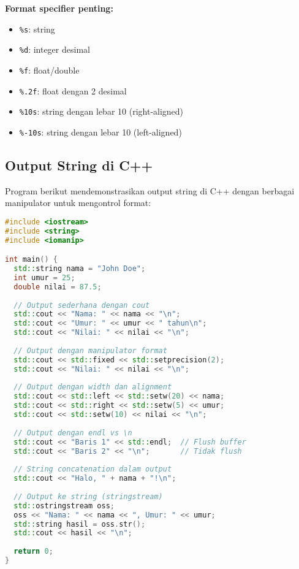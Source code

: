 \documentclass[../main.tex]{subfiles}
\begin{document}
\textbf{Format specifier penting:}
\begin{itemize}
  \item \texttt{\%s}: string
  \item \texttt{\%d}: integer desimal
  \item \texttt{\%f}: float/double
  \item \texttt{\%.2f}: float dengan 2 desimal
  \item \texttt{\%10s}: string dengan lebar 10 (right-aligned)
  \item \texttt{\%-10s}: string dengan lebar 10 (left-aligned)
\end{itemize}

\subsection{Output String di C++}

Program berikut mendemonstrasikan output string di C++ dengan berbagai manipulator untuk mengontrol format:

\begin{lstlisting}[language=C++, caption={Output string di C++}]
#include <iostream>
#include <string>
#include <iomanip>

int main() {
  std::string nama = "John Doe";
  int umur = 25;
  double nilai = 87.5;
  
  // Output sederhana dengan cout
  std::cout << "Nama: " << nama << "\n";
  std::cout << "Umur: " << umur << " tahun\n";
  std::cout << "Nilai: " << nilai << "\n";
  
  // Output dengan manipulator format
  std::cout << std::fixed << std::setprecision(2);
  std::cout << "Nilai: " << nilai << "\n";
  
  // Output dengan width dan alignment
  std::cout << std::left << std::setw(20) << nama;
  std::cout << std::right << std::setw(5) << umur;
  std::cout << std::setw(10) << nilai << "\n";
  
  // Output dengan endl vs \n
  std::cout << "Baris 1" << std::endl;  // Flush buffer
  std::cout << "Baris 2" << "\n";       // Tidak flush
  
  // String concatenation dalam output
  std::cout << "Halo, " + nama + "!\n";
  
  // Output ke string (stringstream)
  std::ostringstream oss;
  oss << "Nama: " << nama << ", Umur: " << umur;
  std::string hasil = oss.str();
  std::cout << hasil << "\n";
  
  return 0;
}
\end{lstlisting}
\end{document}
